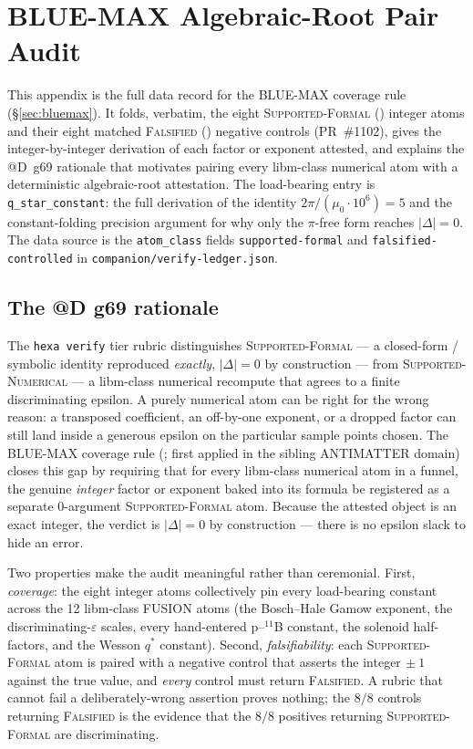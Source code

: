 \section{BLUE-MAX Algebraic-Root Pair Audit}
\label{app:bluemax}

This appendix is the full data record for the BLUE-MAX coverage rule
(\S\ref{sec:bluemax}). It folds, verbatim, the eight
\textsc{Supported-Formal} (\tierBlue) integer atoms and their eight matched
\textsc{Falsified} (\tierRed) negative controls (PR~\#1102), gives the
integer-by-integer derivation of each factor or exponent attested, and
explains the @D~g69 rationale that motivates pairing every libm-class
numerical atom with a deterministic algebraic-root attestation. The
load-bearing entry is \texttt{q\_star\_constant}: the full derivation of the
identity $2\pi/(\mu_0\!\cdot\!10^{6})=5$ and the constant-folding precision
argument for why only the $\pi$-free form reaches $|\Delta|=0$. The data
source is the \texttt{atom\_class} fields \texttt{supported-formal} and
\texttt{falsified-controlled} in \texttt{companion/verify-ledger.json}.

\subsection{The @D g69 rationale}
\label{app:bluemax:rationale}

The \texttt{hexa verify} tier rubric distinguishes
\textsc{Supported-Formal} --- a closed-form / symbolic identity reproduced
\emph{exactly}, $|\Delta|=0$ by construction --- from
\textsc{Supported-Numerical} --- a libm-class numerical recompute that agrees
to a finite discriminating epsilon. A purely numerical atom can be right for
the wrong reason: a transposed coefficient, an off-by-one exponent, or a
dropped factor can still land inside a generous epsilon on the particular
sample points chosen. The BLUE-MAX coverage rule
(\citep{anthropic2026hexag69}; first applied in the sibling ANTIMATTER domain)
closes this gap by requiring that for every libm-class numerical atom in a
funnel, the genuine \emph{integer} factor or exponent baked into its formula be
registered as a separate $0$-argument \textsc{Supported-Formal} atom. Because
the attested object is an exact integer, the verdict is $|\Delta|=0$ by
construction --- there is no epsilon slack to hide an error.

Two properties make the audit meaningful rather than ceremonial. First,
\emph{coverage}: the eight integer atoms collectively pin every load-bearing
constant across the 12 libm-class FUSION atoms (the Bosch--Hale Gamow
exponent, the discriminating-$\varepsilon$ scales, every hand-entered
p--$^{11}$B constant, the solenoid half-factors, and the Wesson $q^{*}$
constant). Second, \emph{falsifiability}: each \textsc{Supported-Formal} atom
is paired with a negative control that asserts the integer$\,\pm1$ against the
true value, and \emph{every} control must return \textsc{Falsified}. A rubric
that cannot fail a deliberately-wrong assertion proves nothing; the
$8/8$ controls returning \textsc{Falsified} is the evidence that the
$8/8$ positives returning \textsc{Supported-Formal} are discriminating.

